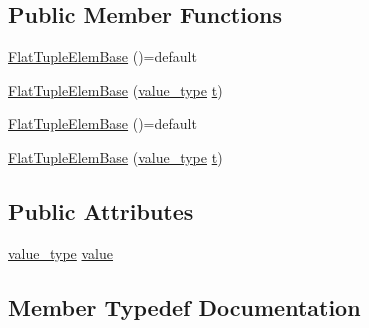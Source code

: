 \subsection*{Public Member Functions}
\begin{DoxyCompactItemize}
\item 
\mbox{\hyperlink{structtesting_1_1internal_1_1_flat_tuple_elem_base_3_01_flat_tuple_3_01_t_8_8_8_01_4_00_01_i_01_4_a7b460283c4ba5ad116a4305d05155546}{Flat\+Tuple\+Elem\+Base}} ()=default
\item 
\mbox{\hyperlink{structtesting_1_1internal_1_1_flat_tuple_elem_base_3_01_flat_tuple_3_01_t_8_8_8_01_4_00_01_i_01_4_a153da382b00977dfb5974f85dd31ea58}{Flat\+Tuple\+Elem\+Base}} (\mbox{\hyperlink{structtesting_1_1internal_1_1_flat_tuple_elem_base_3_01_flat_tuple_3_01_t_8_8_8_01_4_00_01_i_01_4_a6b87a445f87724f9363b348e6c697766}{value\+\_\+type}} \mbox{\hyperlink{_mutual_8h_a978d88b393c8a37dc2614c88788b3442}{t}})
\item 
\mbox{\hyperlink{structtesting_1_1internal_1_1_flat_tuple_elem_base_3_01_flat_tuple_3_01_t_8_8_8_01_4_00_01_i_01_4_a7b460283c4ba5ad116a4305d05155546}{Flat\+Tuple\+Elem\+Base}} ()=default
\item 
\mbox{\hyperlink{structtesting_1_1internal_1_1_flat_tuple_elem_base_3_01_flat_tuple_3_01_t_8_8_8_01_4_00_01_i_01_4_a153da382b00977dfb5974f85dd31ea58}{Flat\+Tuple\+Elem\+Base}} (\mbox{\hyperlink{structtesting_1_1internal_1_1_flat_tuple_elem_base_3_01_flat_tuple_3_01_t_8_8_8_01_4_00_01_i_01_4_a6b87a445f87724f9363b348e6c697766}{value\+\_\+type}} \mbox{\hyperlink{_mutual_8h_a978d88b393c8a37dc2614c88788b3442}{t}})
\end{DoxyCompactItemize}
\subsection*{Public Attributes}
\begin{DoxyCompactItemize}
\item 
\mbox{\hyperlink{structtesting_1_1internal_1_1_flat_tuple_elem_base_3_01_flat_tuple_3_01_t_8_8_8_01_4_00_01_i_01_4_a6b87a445f87724f9363b348e6c697766}{value\+\_\+type}} \mbox{\hyperlink{structtesting_1_1internal_1_1_flat_tuple_elem_base_3_01_flat_tuple_3_01_t_8_8_8_01_4_00_01_i_01_4_ac175518e7807c0b49c0ba8c1c78269ec}{value}}
\end{DoxyCompactItemize}


\subsection{Member Typedef Documentation}
\mbox{\label{structtesting_1_1internal_1_1_flat_tuple_elem_base_3_01_flat_tuple_3_01_t_8_8_8_01_4_00_01_i_01_4_a6b87a445f87724f9363b348e6c697766}} 
